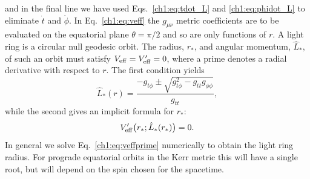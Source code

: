 and in the final line we have used Eqs.~\ref{ch1:eq:tdot_L} and \ref{ch1:eq:phidot_L} to eliminate $\dot{t}$ and $\dot{\phi}$.
In Eq.~\ref{ch1:eq:veff} the $g_{\mu\nu}$ metric coefficients are to be evaluated on the equatorial plane $\theta=\pi/2$ and so are only functions of $r$.
A light ring is a circular null geodesic orbit. 
The radius, $r_*$, and angular momentum, $\hat{L}_*$, of such an orbit must satisfy $V_{\rm eff} = V'_{\rm eff} = 0$, where a prime denotes a radial derivative with respect to $r$. The first condition yields
\begin{equation}
    \hat{L}_*(r) = \frac{-g_{t \phi} \pm \sqrt{g_{t \phi}^2 - g_{t t}g_{\phi \phi}}}{g_{t t}},
\end{equation}
while the second gives an implicit formula for $r_*$:
\begin{equation}\label{ch1:eq:veffprime}
    V'_{\rm eff}\big(r_*;\hat{L}_*(r_*)\big) = 0.
\end{equation}
In general we solve Eq.~\ref{ch1:eq:veffprime} numerically to obtain the light ring radius.
For prograde equatorial orbits in the Kerr metric this will have a single root, but will depend on the spin chosen for the spacetime.

